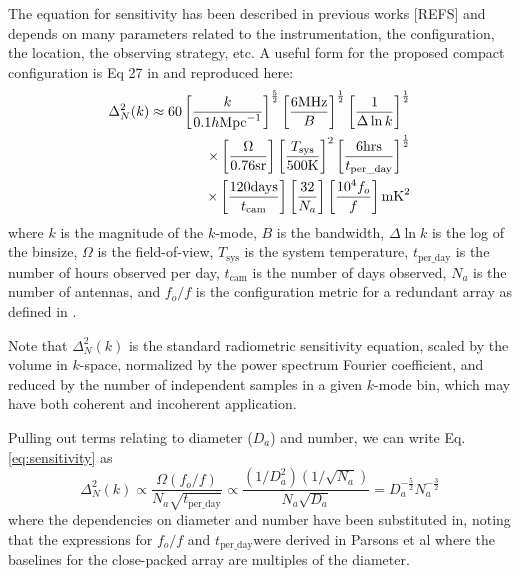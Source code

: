 \documentclass[11pt]{article}
\begin{document}
The equation for sensitivity has been described in previous works [REFS] and depends on many parameters
related to the instrumentation, the configuration, the location, the observing strategy, etc.  A useful form for 
the proposed compact configuration is Eq 27 in \citep{2012ApJ...753...81P} and reproduced here:
\begin{equation}
\centering
\label{eq:sensitivity}
\begin{split}
\Delta^2_N(k) \approx 60 \left[\frac{k}{0.1h\text{Mpc}^{-1}}\right]^\frac{5}{2}
                                         \left[\frac{6 \text{MHz}}{B}\right]^\frac{1}{2}
                                         \left[\frac{1}{\Delta\ln k}\right]^\frac{1}{2} \\
                        \times       \left[\frac{\Omega}{0.76\text{sr}}\right]
                                         \left[\frac{T_\text{sys}}{500 \text{K}}\right]^2
                                         \left[\frac{6 \text{hrs}}{t_\text{per\_day}}\right]^\frac{1}{2} \\
                        \times       \left[\frac{120\text{days}}{t_{\text{cam}}}\right]
                                         \left[\frac{32}{N_a}\right]
                                         \left[\frac{\text{10}^4f_o}{f}\right]  \text{mK}^2
\end{split}
\end{equation}
where $k$ is the magnitude of the $k$-mode, $B$ is the bandwidth, $\Delta\ln k$ is the log
of the binsize, $\Omega$ is the field-of-view, $T_{\text{sys}}$ is the system temperature, 
${t_\text{per\_day}}$ is the number of hours observed per day, $t_{\text{cam}}$ is the number of days
observed, $N_a$ is the number of antennas, and $f_o/f$ is the configuration metric for a 
redundant array as defined in \citep{2012ApJ...753...81P}.

Note that $\Delta^2_N(k)$ is the standard radiometric sensitivity equation, scaled by
the volume in $k$-space, normalized by the power spectrum Fourier coefficient, and
reduced by the number of independent samples in a given $k$-mode bin, which may have
both coherent and incoherent application.

Pulling out terms relating to diameter ($D_a$) and number, we can write Eq. \ref{eq:sensitivity} as
\begin{equation}
\label{eq:reducedSensitivity}
\Delta^2_N(k) \propto \frac{\Omega (f_o/f)}{N_a\sqrt{t_\text{per\_day}}} \propto \frac{(1/D_a^2)(1/\sqrt{N_a})}{N_a\sqrt{D_a}}
= D_a^{-\frac{5}{2}}N_a^{-\frac{3}{2}}
\end{equation}
where the dependencies on diameter and number have been substituted in, noting that the expressions for $f_o/f$ and 
$t_\text{per\_day}$were derived in Parsons et al where the baselines for the close-packed array are multiples of the diameter.
\end{document}
